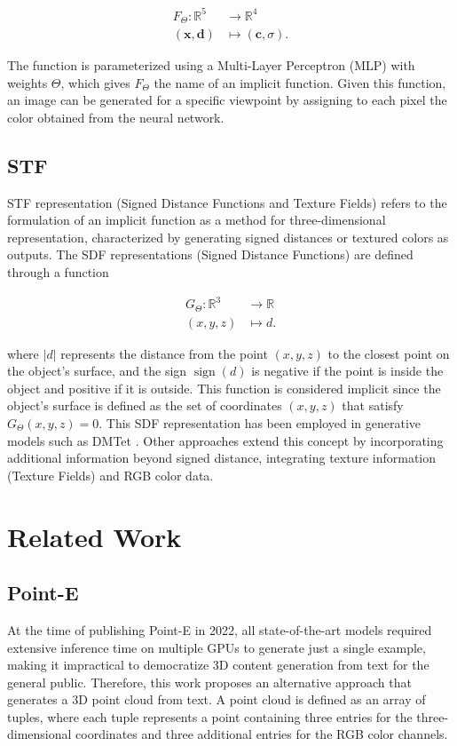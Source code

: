 \documentclass[journal]{IEEEtran}
\begin{document}
\begin{align*}
    F_{\Theta}: \mathbb{R}^5 &\rightarrow \mathbb{R}^4\\
    (\textbf{x}, \textbf{d}) &\mapsto (\textbf{c}, \sigma).
\end{align*}  

The function is parameterized using a Multi-Layer Perceptron (MLP) with weights $\Theta$, which gives $F_\Theta$ the name of an implicit function. Given this function, an image can be generated for a specific viewpoint by assigning to each pixel the color obtained from the neural network.

\subsection{STF}
\label{subsec:stf}

STF representation (Signed Distance Functions and Texture Fields) refers to the formulation of an implicit function as a method for three-dimensional representation, characterized by generating signed distances or textured colors as outputs. The SDF representations (Signed Distance Functions) are defined through a function

\begin{align*}
    G_{\Theta}:  \mathbb{R}^3 &\rightarrow \mathbb{R}\\
    (x,y,z) &\mapsto d.
\end{align*}

where $|d|$ represents the distance from the point $(x,y,z)$ to the closest point on the object's surface, and the sign $\operatorname{sign}(d)$ is negative if the point is inside the object and positive if it is outside. This function is considered implicit since the object's surface is defined as the set of coordinates $(x,y,z)$ that satisfy $G_\Theta(x,y,z) = 0$.
This SDF representation has been employed in generative models such as DMTet \cite{dmtet}. Other approaches extend this concept by incorporating additional information beyond signed distance, integrating texture information (Texture Fields) and RGB color data.

\section{Related Work}\label{sec:relatedwork}

\subsection{Point-E}\label{sec:pointe}
At the time of publishing Point-E \cite{Point-E} in 2022, all state-of-the-art models required extensive inference time on multiple GPUs to generate just a single example, making it impractical to democratize 3D content generation from text for the general public. Therefore, this work proposes an alternative approach that generates a 3D point cloud from text. A point cloud is defined as an array of tuples, where each tuple represents a point containing three entries for the three-dimensional coordinates and three additional entries for the RGB color channels.
\\
\end{document}
